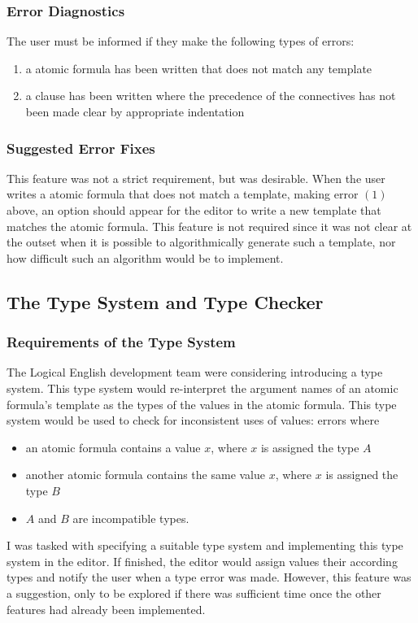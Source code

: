 \documentclass[../main.tex]{subfiles}
\begin{document}
\subsubsection{Error Diagnostics}
The user must be informed if they make the following types of errors:
\begin{enumerate}
    \item a atomic formula has been written that does not match any template 
    \item a clause has been written where the precedence of the connectives has not been made clear by appropriate indentation
\end{enumerate}

\subsubsection{Suggested Error Fixes}
This feature was not a strict requirement, but was desirable. When the user writes a atomic formula that does not match a template, making error $(1)$ above, an option should appear for the editor to write a new template that matches the atomic formula. This feature is not required since it was not clear at the outset when it is possible to algorithmically generate such a template, nor how difficult such an algorithm would be to implement.

\subsection{The Type System and Type Checker}
\subsubsection{Requirements of the Type System}
The Logical English development team were considering introducing a type system. This type system would re-interpret the argument names of an atomic formula's template as the types of the values in the atomic formula. This type system would be used to check for inconsistent uses of values: errors where
\begin{itemize}
    \item an atomic formula contains a value $x$, where $x$ is assigned the type $A$
    \item another atomic formula contains the same value $x$, where $x$ is assigned the type $B$
    \item $A$ and $B$ are incompatible types.
\end{itemize}
I was tasked with specifying a suitable type system and implementing this type system in the editor. If finished, the editor would assign values their according types and notify the user when a type error was made. However, this feature was a suggestion, only to be explored if there was sufficient time once the other features had already been implemented. 
\end{document}

